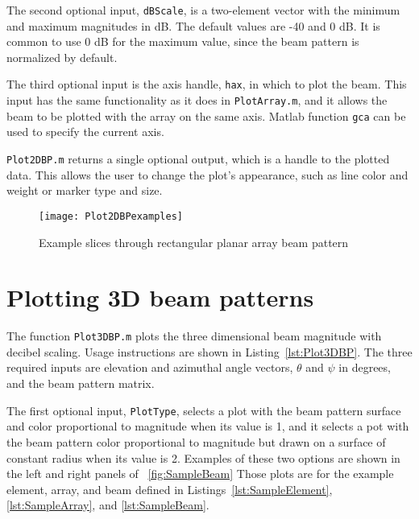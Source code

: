 The second optional input, \texttt{dBScale}, is a two-element vector with the minimum and maximum magnitudes in dB. The default values are -40 and 0 dB. It is common to use 0 dB for the maximum value, since the beam pattern is normalized by default.

The third optional input is the axis handle, \texttt{hax}, in which to plot the beam. This input has the same functionality as it does in \texttt{PlotArray.m}, and it allows the beam to be plotted with the array on the same axis. Matlab function \texttt{gca} can be used to specify the current axis.

\texttt{Plot2DBP.m} returns a single optional output, which is a handle to the plotted data. This allows the user to change the plot's appearance, such as line color and weight or marker type and size.



\clearpage
\begin{sidewaysfigure}[!ht]
\begin{center}
\texttt{[image: Plot2DBPexamples]}
\caption{\label{fig:Plot2DBPexamples}Example slices through rectangular planar array beam pattern}
\end{center}
\end{sidewaysfigure}

\clearpage
\section{Plotting 3D beam patterns}

The function \texttt{Plot3DBP.m} plots the three dimensional beam magnitude with decibel scaling. Usage instructions are shown in Listing~\ref{lst:Plot3DBP}. The three required inputs are elevation and azimuthal angle vectors, $\theta$ and $\psi$ in degrees, and the beam pattern matrix. 

The first optional input, \texttt{PlotType}, selects a plot with the beam pattern surface and color proportional to magnitude when its value is 1, and it selects a pot with the beam pattern color proportional to magnitude but drawn on a surface of constant radius when its value is 2. Examples of these two options are shown in the left and right panels of \figname~\ref{fig:SampleBeam} Those plots are for the example element, array, and beam defined in Listings~\ref{lst:SampleElement}, \ref{lst:SampleArray}, and \ref{lst:SampleBeam}.

